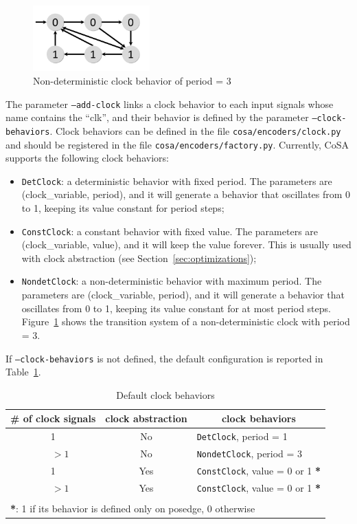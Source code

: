 \documentclass{article}
\theoremstyle{definition}
\begin{document}
\begin{figure}[ht]
  \centering
    \includegraphics[width=0.4\textwidth]{img/NonDetClock.pdf}
    \caption{Non-deterministic clock behavior of period = 3}
    \label{fig:nondet_clock}
\end{figure}

The parameter \texttt{--add-clock} links a clock behavior to each
input signals whose name contains the ``clk'', and their behavior is
defined by the parameter \texttt{--clock-behaviors}. Clock behaviors
can be defined in the file \texttt{cosa/encoders/clock.py} and should
be registered in the file
\texttt{cosa/encoders/factory.py}. Currently, CoSA supports the
following clock behaviors:

\begin{itemize}
\item \texttt{DetClock}: a deterministic behavior with fixed
  period. The parameters are (clock\_variable, period), and it will
  generate a behavior that oscillates from 0 to 1, keeping its value
  constant for period steps;
\item \texttt{ConstClock}: a constant behavior with fixed value. The
  parameters are (clock\_variable, value), and it will keep the value
  forever. This is usually used with clock abstraction (see
  Section~\ref{sec:optimizations});
\item \texttt{NondetClock}: a non-deterministic behavior with maximum
  period. The parameters are (clock\_variable, period), and it will
  generate a behavior that oscillates from 0 to 1, keeping its value
  constant for at most period steps. Figure~\ref{fig:nondet_clock}
  shows the transition system of a non-deterministic clock with period
  = 3.
\end{itemize}

If \texttt{--clock-behaviors} is not defined, the default
configuration is reported in Table~\ref{tab:clock_default}.

\begin{table}[h]
  \centering
\begin{tabular}{ c c | l }
  \# of clock signals & clock abstraction & \multicolumn{1}{c}{clock behaviors} \\ \hline 
  1 & No & \texttt{DetClock}, period = 1 \\
  ~~~$>1$ & No & \texttt{NondetClock}, period = 3  \\
  1 & Yes & \texttt{ConstClock}, value = 0 or 1 \textbf{*}\\
  ~~~$>1$ & Yes & \texttt{ConstClock}, value = 0 or 1 \textbf{*} \\
  \\
  \multicolumn{3}{l}{\textbf{*}: 1 if its behavior is defined only on posedge, 0 otherwise}
\end{tabular}
\caption{Default clock behaviors}
\label{tab:clock_default}
\end{table}
\end{document}
